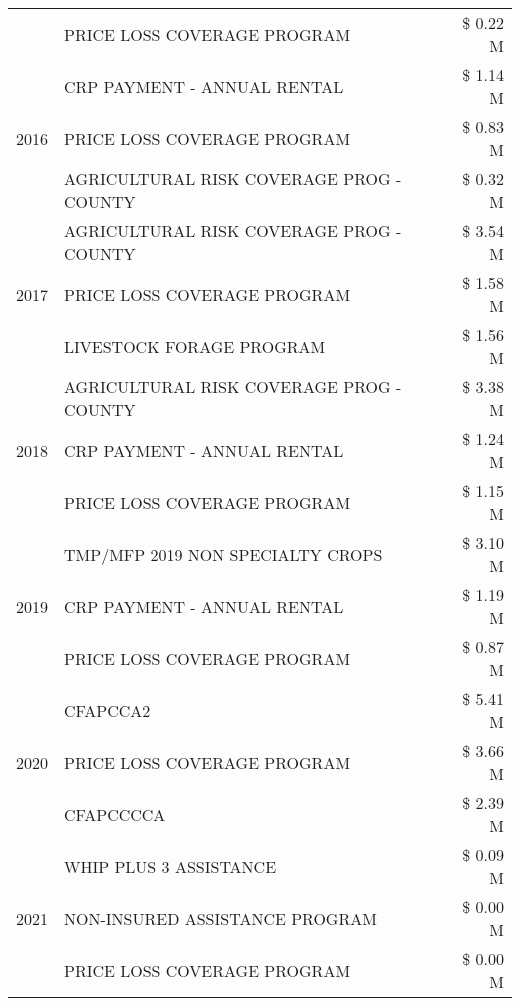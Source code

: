 \begin{tabular}{llr}
 & PRICE LOSS COVERAGE PROGRAM & \$ 0.22 M \\
\cline{1-3}
\multirow[t]{3}{*}{2016} & CRP PAYMENT - ANNUAL RENTAL & \$ 1.14 M \\
 & PRICE LOSS COVERAGE PROGRAM & \$ 0.83 M \\
 & AGRICULTURAL RISK COVERAGE PROG - COUNTY & \$ 0.32 M \\
\cline{1-3}
\multirow[t]{3}{*}{2017} & AGRICULTURAL RISK COVERAGE PROG - COUNTY & \$ 3.54 M \\
 & PRICE LOSS COVERAGE PROGRAM & \$ 1.58 M \\
 & LIVESTOCK FORAGE PROGRAM & \$ 1.56 M \\
\cline{1-3}
\multirow[t]{3}{*}{2018} & AGRICULTURAL RISK COVERAGE PROG - COUNTY & \$ 3.38 M \\
 & CRP PAYMENT - ANNUAL RENTAL & \$ 1.24 M \\
 & PRICE LOSS COVERAGE PROGRAM & \$ 1.15 M \\
\cline{1-3}
\multirow[t]{3}{*}{2019} & TMP/MFP 2019 NON SPECIALTY CROPS & \$ 3.10 M \\
 & CRP PAYMENT - ANNUAL RENTAL & \$ 1.19 M \\
 & PRICE LOSS COVERAGE PROGRAM & \$ 0.87 M \\
\cline{1-3}
\multirow[t]{3}{*}{2020} & CFAPCCA2 & \$ 5.41 M \\
 & PRICE LOSS COVERAGE PROGRAM & \$ 3.66 M \\
 & CFAPCCCCA & \$ 2.39 M \\
\cline{1-3}
\multirow[t]{3}{*}{2021} & WHIP PLUS 3 ASSISTANCE & \$ 0.09 M \\
 & NON-INSURED ASSISTANCE PROGRAM & \$ 0.00 M \\
 & PRICE LOSS COVERAGE PROGRAM & \$ 0.00 M \\
\cline{1-3}
\bottomrule
\end{tabular}
